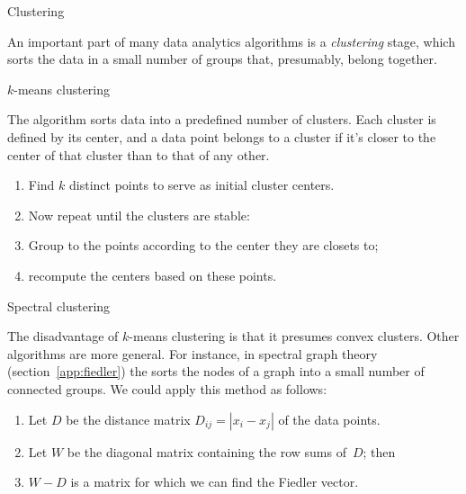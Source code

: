 
\def\R{{\cal R}}

 {Clustering}

An important part of many data analytics algorithms
is a \emph{clustering} stage, which sorts the data
in a small number of groups that, presumably, belong together.

 {$k$-means clustering}

The  algorithm sorts data
into a predefined number of clusters. Each cluster is defined by
its center, and a data point belongs to a cluster if it's closer
to the center of that cluster than to that of any other.

\begin{enumerate}
\item Find $k$ distinct points to serve as initial cluster centers.
\item Now repeat until the clusters are stable:
\item Group to the points according to the center they are closets to;
\item recompute the centers based on these points.
\end{enumerate}

 {Spectral clustering}

The disadvantage of $k$-means clustering is that it presumes convex clusters.
Other algorithms are more general. For instance, in spectral graph theory
(section~\ref{app:fiedler}) the  sorts the nodes of a graph
into a small number of connected groups. We could apply this method as follows:
\begin{enumerate}
\item Let $D$ be the distance matrix $D_{ij}=|x_i-x_j|$ of the data points.
\item Let $W$ be the diagonal matrix containing the row sums of~$D$; then
\item $W-D$ is a matrix for which we can find the Fiedler vector.
\end{enumerate}

